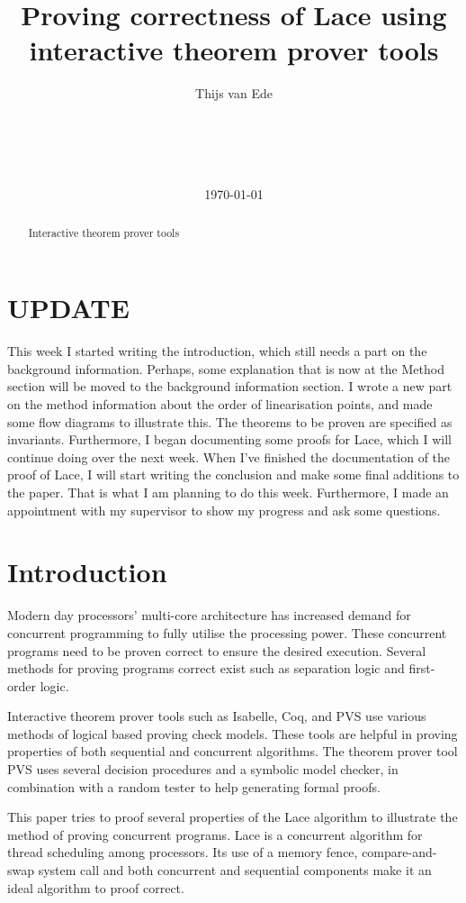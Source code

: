 \documentclass{sig-alternate-br}
\title{Proving correctness of Lace using interactive theorem prover tools}
\author{
	\alignauthor
	Thijs van Ede\\
	\affaddr{University of Twente}\\
	\affaddr{P.O. Box 217, 7500AE Enschede}\\
	\affaddr{The Netherlands}\\
	\affaddr{t.s.vanede@student.utwente.nl}\\
}
\date{\today}
\begin{document}
\maketitle

\section{UPDATE}
This week I started writing the introduction, which still needs a part on the background information. Perhaps, some explanation that is now at the Method section will be moved to the background information section. I wrote a new part on the method information about the order of linearisation points, and made some flow diagrams to illustrate this. The theorems to be proven are specified as invariants. Furthermore, I began documenting some proofs for Lace, which I will continue doing over the next week. When I've finished the documentation of the proof of Lace, I will start writing the conclusion and make some final additions to the paper. That is what I am planning to do this week. Furthermore, I made an appointment with my supervisor to show my progress and ask some questions.

\begin{abstract}
Interactive theorem prover tools 
\end{abstract}

\section{Introduction}
Modern day processors' multi-core architecture has increased demand for concurrent programming to fully utilise the processing power.
These concurrent programs need to be proven correct to ensure the desired execution.
Several methods for proving programs correct exist such as separation logic\cite{reynolds2002} and first-order logic\cite{smullyan1995}.

Interactive theorem prover tools such as Isabelle\cite{paulson1994isabelle}, Coq\cite{coq2015}, and PVS\cite{owre1992pvs} use various methods of logical based proving check models.
These tools are helpful in proving properties of both sequential\cite{badban2005verification} and concurrent\cite{colvin2006formal} \cite{shankar1993verification} algorithms.
The theorem prover tool PVS uses several decision procedures and a symbolic model checker, in combination with a random tester to help generating formal proofs.

This paper tries to proof several properties of the Lace algorithm\cite{vanDijk2014206} to illustrate the method of proving concurrent programs.
Lace is a concurrent algorithm for thread scheduling among processors.
Its use of a memory fence, compare-and-swap system call and both concurrent and sequential components make it an ideal algorithm to proof correct.
\end{document}
